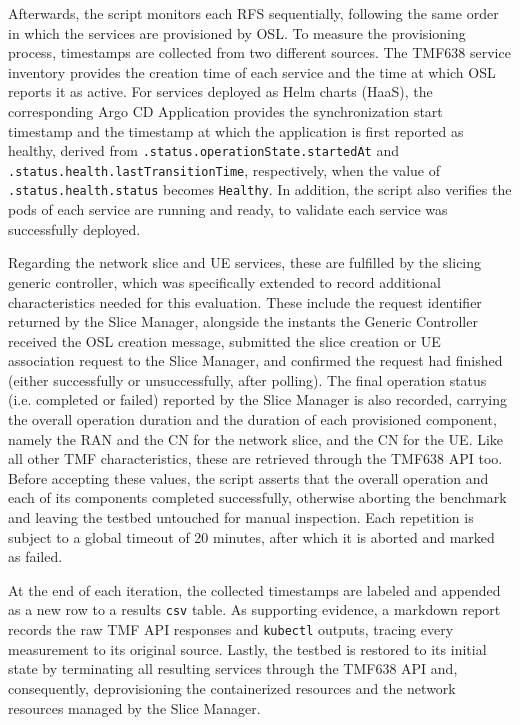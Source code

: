 Afterwards, the script monitors each \acs{RFS} sequentially, following the same order in which the services are provisioned by \acs{OSL}. To measure the provisioning process, timestamps are collected from two different sources. The \acs{TMF}638 service inventory provides the creation time of each service and the time at which \acs{OSL} reports it as active. For services deployed as Helm charts (\acs{HaaS}), the corresponding Argo CD Application provides the synchronization start timestamp and the timestamp at which the application is first reported as healthy, derived from \texttt{.status\allowbreak.operationState\allowbreak.startedAt} and \texttt{.status\allowbreak.health\allowbreak.lastTransitionTime}, respectively, when the value of \texttt{.status\allowbreak.health\allowbreak.status} becomes \texttt{Healthy}. In addition, the script also verifies the pods of each service are running and ready, to validate each service was successfully deployed.

Regarding the network slice and \acs{UE} services, these are fulfilled by the slicing generic controller, which was specifically extended to record additional characteristics needed for this evaluation. These include the request identifier returned by the Slice Manager, alongside the instants the Generic Controller received the \acs{OSL} creation message, submitted the slice creation or \acs{UE} association request to the Slice Manager, and confirmed the request had finished (either successfully or unsuccessfully, after polling). The final operation status (i.e. completed or failed) reported by the Slice Manager is also recorded, carrying the overall operation duration and the duration of each provisioned component, namely the \acs{RAN} and the \acs{CN} for the network slice, and the \acs{CN} for the \acs{UE}. Like all other \acs{TMF} characteristics, these are retrieved through the \acs{TMF}638 \acs{API} too. Before accepting these values, the script asserts that the overall operation and each of its components completed successfully, otherwise aborting the benchmark and leaving the testbed untouched for manual inspection. Each repetition is subject to a global timeout of 20 minutes, after which it is aborted and marked as failed.

At the end of each iteration, the collected timestamps are labeled and appended as a new row to a results \texttt{csv} table. As supporting evidence, a markdown report records the raw \acs{TMF} \acs{API} responses and \texttt{kubectl} outputs, tracing every measurement to its original source. Lastly, the testbed is restored to its initial state by terminating all resulting services through the \acs{TMF}638 \acs{API} and, consequently, deprovisioning the containerized resources and the network resources managed by the Slice Manager.

